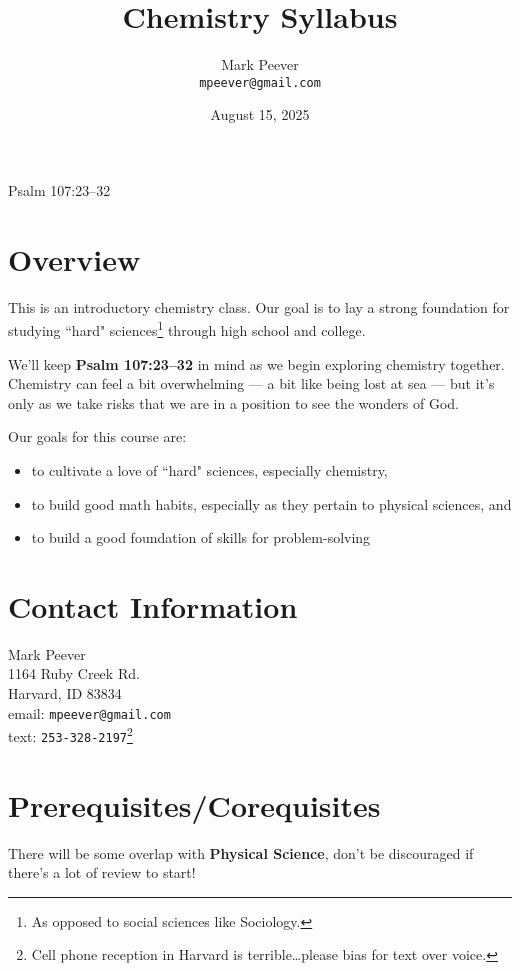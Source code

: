 \documentclass[11pt, oneside]{article}   	%
\title{Chemistry Syllabus}
\author{Mark Peever\\ \texttt{mpeever@gmail.com}}
\date{August 15, 2025}
\begin{document}
\maketitle

\begin{center}
Psalm 107:23--32
\end{center}

\section{Overview}
This is an introductory chemistry class. Our goal is to lay a strong foundation for studying ``hard" sciences\footnote{As opposed to social sciences like Sociology.} through high school and college. 

We'll keep \textbf{Psalm 107:23--32} in mind as we begin exploring chemistry together. Chemistry can feel a bit overwhelming --- a bit like being lost at sea --- but it's only as we take risks that we are in a position to see the wonders of God.

Our goals for this course are:
\begin{itemize}
\item to cultivate a love of ``hard" sciences, especially chemistry,
\item to build good math habits, especially as they pertain to physical sciences, and
\item to build a good foundation of skills for problem-solving
\end{itemize}

\section{Contact Information}
Mark Peever\\
1164 Ruby Creek Rd.\\
Harvard, ID 83834 \\
email: \texttt{mpeever@gmail.com} \\
text: \texttt{253-328-2197}\footnote{Cell phone reception in Harvard is terrible\ldots please bias for text over voice.} \\

\section{Prerequisites/Corequisites}
There will be some overlap with \textbf{Physical Science}, don't be discouraged if there's a lot of review to start!
\end{document}
